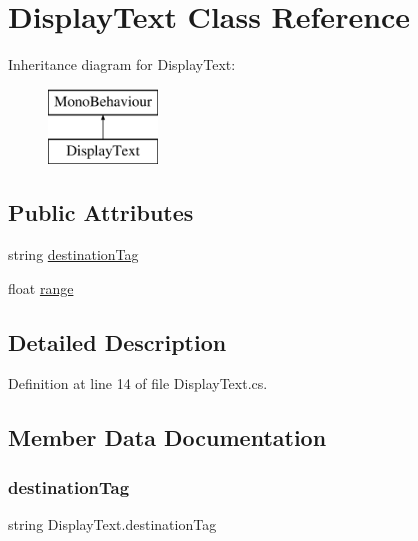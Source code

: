 \hypertarget{class_display_text}{}\section{Display\+Text Class Reference}
\label{class_display_text}
Inheritance diagram for Display\+Text\+:\begin{figure}[H]
\begin{center}
\leavevmode
\includegraphics[height=2.000000cm]{class_display_text}
\end{center}
\end{figure}
\subsection*{Public Attributes}
\begin{DoxyCompactItemize}
\item 
string \hyperlink{class_display_text_af937617cbc62e0c9065018c4ab9f7aff}{destination\+Tag}
\item 
float \hyperlink{class_display_text_a284398d2c2ca647b4828d384496447ba}{range}
\end{DoxyCompactItemize}


\subsection{Detailed Description}


Definition at line 14 of file Display\+Text.\+cs.



\subsection{Member Data Documentation}
\hypertarget{class_display_text_af937617cbc62e0c9065018c4ab9f7aff}{}\label{class_display_text_af937617cbc62e0c9065018c4ab9f7aff} 
\subsubsection{\texorpdfstring{destination\+Tag}{destinationTag}}
{\footnotesize\ttfamily string Display\+Text.\+destination\+Tag}



